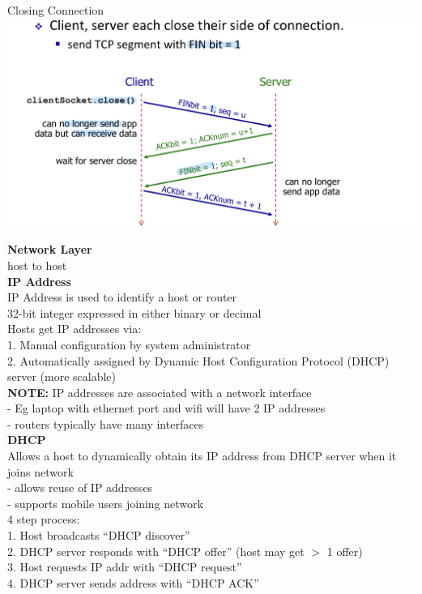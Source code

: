 \documentclass[10pt, a4paper]{article}
\newcommand{\highlight}[1]{{\color{red}\textbf{#1}}}
\newcommand{\blue}[1]{{\color{MidnightBlue}#1}}
\begin{document}
\begin{multicols*}{3}
		Closing Connection\\
		\includegraphics[scale=.14]{./assets/tcpCloseConnection}

		{\normalsize\textbf{Network Layer}}\\
		host to host\\

		\textbf{IP Address}\\
		IP Address is used to identify a host or router\\
		32-bit integer expressed in either binary or decimal\\
		Hosts get IP addresses via:\\
		1. Manual configuration by system administrator\\
		2. Automatically assigned by Dynamic Host Configuration Protocol (DHCP) server (more scalable)\\
		\highlight{NOTE:} IP addresses are associated with a \blue{network interface}\\
		- Eg laptop with ethernet port and wifi will have 2 IP addresses\\
		- routers typically have many interfaces\\
		\textbf{DHCP}\\
		Allows a host to dynamically obtain its IP address from DHCP server when it joins network\\
		- allows reuse of IP addresses\\
		- supports mobile users joining network\\

		\blue{4 step process:}\\
		1. Host broadcasts \blue{``DHCP discover''}\\
		2. DHCP server responds with \blue{``DHCP offer''} (host may get $>$ 1 offer)\\
		3. Host requests IP addr with \blue{``DHCP request''}\\
		4. DHCP server sends address with \blue{``DHCP ACK''}\\


\end{multicols*}
\end{document}
